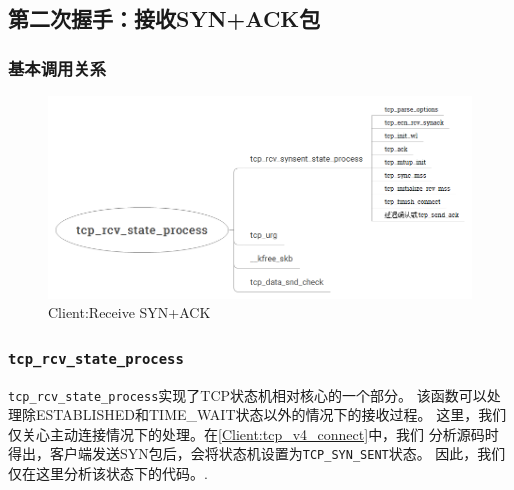 \subsection{第二次握手：接收SYN+ACK包}
\label{Client:Recv SYN+ACK}

    \subsubsection{基本调用关系}

                \begin{figure}[htb]        
                    \centering
                    \includegraphics[width=\textwidth]  {images/Client:Receive SYN +ACK.png}
					\caption{Client:Receive SYN+ACK}
					\label{Client:Receive SYN+ACK}
                \end{figure} 

    \subsubsection{\texttt{tcp_rcv_state_process}}
		\label{SYN+ACK:tcp_rcv_state_process}
        \texttt{tcp_rcv_state_process}实现了TCP状态机相对核心的一个部分。
        该函数可以处理除ESTABLISHED和TIME\_WAIT状态以外的情况下的接收过程。
        这里，我们仅关心主动连接情况下的处理。在\ref{Client:tcp_v4_connect}中，我们
        分析源码时得出，客户端发送SYN包后，会将状态机设置为\texttt{TCP_SYN_SENT}状态。
        因此，我们仅在这里分析该状态下的代码。.

